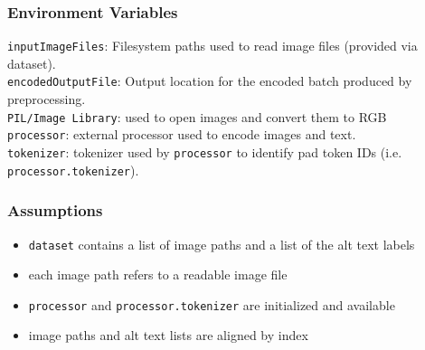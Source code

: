 \documentclass[12pt, titlepage]{article}
\begin{document}
\subsubsection{Environment Variables}
\texttt{inputImageFiles}: Filesystem paths used to read image files (provided via dataset).\\
\texttt{encodedOutputFile}: Output location for the encoded batch produced by preprocessing.\\
\texttt{PIL/Image Library}: used to open images and convert them to RGB\\
\texttt{processor}:  external processor used to encode images and text.\\
\texttt{tokenizer}:  tokenizer used by \texttt{processor} to identify pad token IDs (i.e. \texttt{processor.tokenizer}).

\subsubsection{Assumptions}
\begin{itemize}
  \item \texttt{dataset} contains a list of image paths and a list of the alt text labels
  \item each image path refers to a readable image file
  \item \texttt{processor} and \texttt{processor.tokenizer} are initialized and available
  \item image paths and alt text lists are aligned by index
\end{itemize}
\end{document}
